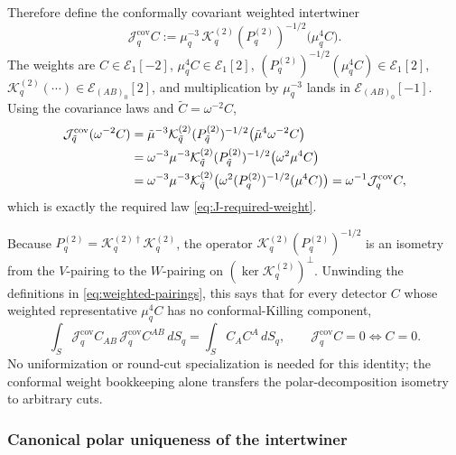 \documentclass[11pt,a4paper]{article}
\begin{document}
Therefore define the conformally covariant weighted intertwiner
\begin{equation}\label{eq:covariant-J}
  \mathcal J_q^{\mathrm{cov}}C
  :=
  \mu_q^{-3}\,
  \mathcal K_q^{(2)}
  (P_q^{(2)})^{-1/2}
  \big(\mu_q^4 C\big) .
\end{equation}
The weights are \(C\in\mathcal E_1[-2]\),
\(\mu_q^4C\in\mathcal E_1[2]\),
\((P_q^{(2)})^{-1/2}(\mu_q^4C)\in\mathcal E_1[2]\),
\(\mathcal K_q^{(2)}(\cdots)\in\mathcal E_{(AB)_0}[2]\), and multiplication by
\(\mu_q^{-3}\) lands in \(\mathcal E_{(AB)_0}[-1]\).  Using the covariance laws and \(\tilde C=\omega^{-2}C\),
\begin{align}
  \mathcal J_{\tilde q}^{\mathrm{cov}}(\omega^{-2}C)
  &=
  \tilde\mu^{-3}
  \mathcal K_{\tilde q}^{(2)}
  (P_{\tilde q}^{(2)})^{-1/2}
  \big(\tilde\mu^4\omega^{-2}C\big)
  \notag\\
  &=
  \omega^{-3}\mu^{-3}
  \mathcal K_{\tilde q}^{(2)}
  (P_{\tilde q}^{(2)})^{-1/2}
  \big(\omega^2\mu^4C\big)
  \\
  &=
  \omega^{-3}\mu^{-3}
  \mathcal K_{\tilde q}^{(2)}
  \big(\omega^2(P_q^{(2)})^{-1/2}(\mu^4C)\big)
  =
  \omega^{-1}\mathcal J_q^{\mathrm{cov}}C ,
  \notag
\end{align}
which is exactly the required law \eqref{eq:J-required-weight}.

Because \(P_q^{(2)}=\mathcal K_q^{(2)\dagger}\mathcal K_q^{(2)}\), the operator
\(\mathcal K_q^{(2)}(P_q^{(2)})^{-1/2}\) is an isometry from the \(V\)-pairing to the \(W\)-pairing on \((\ker\mathcal K_q^{(2)})^\perp\).  Unwinding the definitions in \eqref{eq:weighted-pairings}, this says that for every detector \(C\) whose weighted representative \(\mu_q^4C\) has no conformal-Killing component,
\begin{equation}\label{eq:covariant-J-isometry}
  \int_S
  \mathcal J_q^{\mathrm{cov}}C_{AB}\,
  \mathcal J_q^{\mathrm{cov}}C^{AB}\,dS_q
  =
  \int_S C_AC^A\,dS_q ,
  \qquad
  \mathcal J_q^{\mathrm{cov}}C=0\iff C=0 .
\end{equation}
No uniformization or round-cut specialization is needed for this identity; the conformal weight bookkeeping alone transfers the polar-decomposition isometry to arbitrary cuts.

\subsubsection{Canonical polar uniqueness of the intertwiner}
\end{document}
